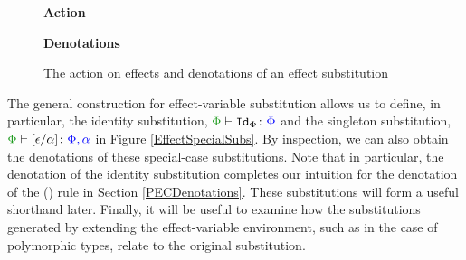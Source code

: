 \documentclass{Report}
\begin{document}
\begin{figure}[H]
    \centering
    \begin{minipage}{0.47\textwidth}
      \begin{framed}
        \centering
        \textbf{Action}
  
      \end{framed}
    \end{minipage}
    \quad
    \begin{minipage}{0.47\textwidth}
      \begin{framed}
        \centering
        \textbf{Denotations}
  
      \end{framed}
    \end{minipage}
    \caption{The action on effects and denotations of an effect substitution}
    \label{EffectSubstitutionActionEffects}
\end{figure}

The general construction for effect-variable substitution allows us to define, in particular, the identity substitution, $\typerelation{\P}{\Id{\P}}{\P}$ and the singleton substitution, $\typerelation{\P}{\ssub{\a}{\e}}{\P,\a}$ in Figure \ref{EffectSpecialSubs}. By inspection, we can also obtain the denotations of these special-case substitutions. Note that in particular, the denotation of the identity substitution completes our intuition for the denotation of the (\textit{\vspec}) rule in Section \ref{PECDenotations}. These substitutions will form a useful shorthand later. Finally, it will be useful to examine how the substitutions generated by extending the effect-variable environment, such as in the case of polymorphic types, relate to the original substitution.
\end{document}
